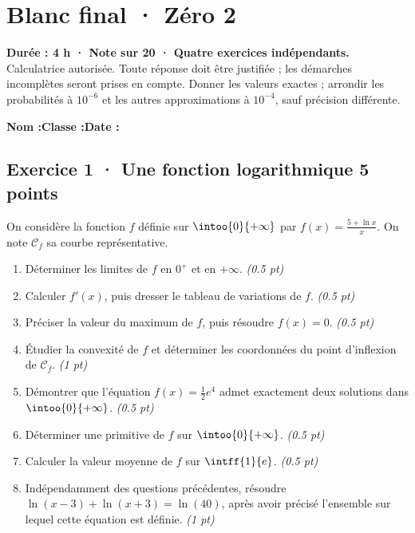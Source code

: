 \fi

\mxnewpage{}\label{sujet:9-2}

\section*{Blanc final · Zéro 2}


\textbf{Durée : 4 h · Note sur 20 · Quatre exercices indépendants.}\\Calculatrice autorisée. Toute réponse doit être justifiée ; les démarches incomplètes seront prises en compte. Donner les valeurs exactes ; arrondir les probabilités à $10^{-6}$ et les autres approximations à $10^{-4}$, sauf précision différente.

\smallskip\textbf{Nom :}\enspace\dotfill\quad\textbf{Classe :}\enspace\dotfill\quad\textbf{Date :}\enspace\dotfill

\subsection*{Exercice 1 · Une fonction logarithmique \hfill 5 points}On considère la fonction $f$ définie sur $\intoo{0}{+\infty}$ par $f(x)=\frac{5+\ln x}x$. On note $\mathcal C_f$ sa courbe représentative.

\begin{enumerate}

\item Déterminer les limites de $f$ en $0^+$ et en $+\infty$. \hfill\textit{(\num{0,5} pt)}

\item Calculer $f' (x)$, puis dresser le tableau de variations de $f$. \hfill\textit{(\num{0,5} pt)}

\item Préciser la valeur du maximum de $f$, puis résoudre $f(x)=0$. \hfill\textit{(\num{0,5} pt)}

\item Étudier la convexité de $f$ et déterminer les coordonnées du point d'inflexion de $\mathcal C_f$. \hfill\textit{(1 pt)}

\item Démontrer que l'équation $f(x)=\frac12 e^{4}$ admet exactement deux solutions dans $\intoo{0}{+\infty}$. \hfill\textit{(\num{0,5} pt)}

\item Déterminer une primitive de $f$ sur $\intoo{0}{+\infty}$. \hfill\textit{(\num{0,5} pt)}

\item Calculer la valeur moyenne de $f$ sur $\intff{1}{e}$. \hfill\textit{(\num{0,5} pt)}

\item Indépendamment des questions précédentes, résoudre $\ln(x-3)+\ln(x+3)=\ln(40)$, après avoir précisé l'ensemble sur lequel cette équation est définie. \hfill\textit{(1 pt)}

\end{enumerate}

